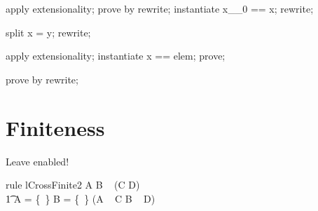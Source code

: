 \begin{LPScript}\begin{forget}[lSmallerDisjointSetSubsumption]
apply extensionality;
prove by rewrite;
instantiate x\_\_0 == x;
rewrite;
\end{forget}\end{LPScript}

\begin{LPScript}\begin{forget}[lFlipEquiv]
split x = y;
rewrite;
\end{forget}\end{LPScript}

\begin{LPScript}\begin{forget}[lElemSetNonEmpty]
apply extensionality;
instantiate x == elem;
prove;
\end{forget}\end{LPScript}

\begin{LPScript}\begin{forget}[lBigCupElemType]
prove by rewrite;
\end{forget}\end{LPScript}


\section{Finiteness}

Leave enabled!
\begin{LTrivial}
\begin{theorem}{rule lCrossFinite2} %
  A \cross B \in \finset~ (C \cross D) \iff \\\t1
  A = \{~\} \lor B = \{~\} \lor (A \in \finset~ C \land B \in \finset~ D)
\end{theorem}
\end{LTrivial}



